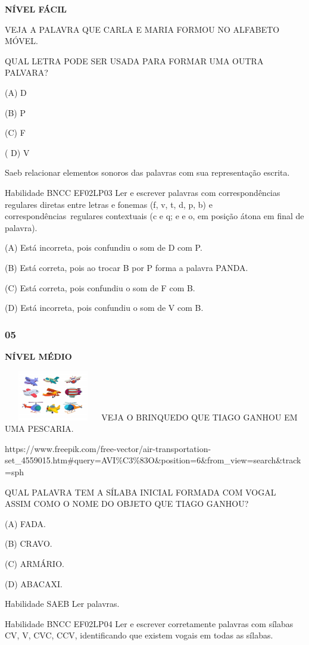 \textbf{NÍVEL FÁCIL}

VEJA A PALAVRA QUE CARLA E MARIA FORMOU NO ALFABETO MÓVEL.

QUAL LETRA PODE SER USADA PARA FORMAR UMA OUTRA PALVARA?

(A) D

(B) P

(C) F

( D) V

Saeb relacionar elementos sonoros das palavras com sua representação
escrita.

Habilidade BNCC EF02LP03 Ler e escrever palavras com correspondências
regulares diretas entre letras e fonemas (f, v, t, d, p, b) e
correspondências~regulares contextuais (c e q; e e o, em posição átona
em final de palavra).

(A) Está incorreta, pois confundiu o som de D com P.

(B) Está correta, pois ao trocar B por P forma a palavra PANDA.

(C) Está correta, pois confundiu o som de F com B.

(D) Está incorreta, pois confundiu o som de V com B.

\subsubsection{05 }\label{section-147}

\textbf{NÍVEL MÉDIO}

\includegraphics[width=1.69097in,height=0.86538in]{media/image177.jpeg}VEJA
O BRINQUEDO QUE TIAGO GANHOU EM UMA PESCARIA.

https://www.freepik.com/free-vector/air-transportation-set\_4559015.htm\#query=AVI\%C3\%83O\&position=6\&from\_view=search\&track=sph

QUAL PALAVRA TEM A SÍLABA INICIAL FORMADA COM VOGAL ASSIM COMO O NOME DO
OBJETO QUE TIAGO GANHOU?

(A) FADA.

(B) CRAVO.

(C) ARMÁRIO.

(D) ABACAXI.

Habilidade SAEB Ler palavras.

Habilidade BNCC EF02LP04 Ler e escrever corretamente palavras com
sílabas CV, V, CVC, CCV, identificando que existem vogais em todas as
sílabas.

